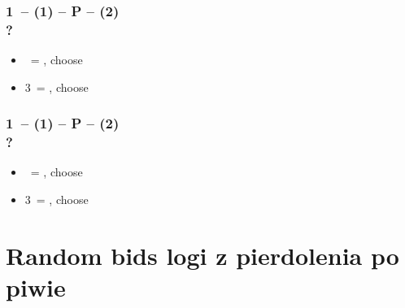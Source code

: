 \documentclass[12pt, a4paper]{article}
\begin{document}
\subsubsection*{1\diams\ -- (1\spades) -- P -- (2\spades) \\ ?}
\begin{itemize}
    \item \dbl\ = \diams\hearts, choose
    \item 3\clubs\ = \clubs\diams, choose
\end{itemize}

\subsubsection*{1\diams\ -- (1\hearts) -- P -- (2\hearts) \\ ?}
\begin{itemize}
    \item \dbl\ = \diams\spades, choose
    \item 3\clubs\ = \clubs\diams, choose
\end{itemize}



\section{Random bids {\color{anti-flashwhite}logi z pierdolenia po piwie}}
\end{document}
